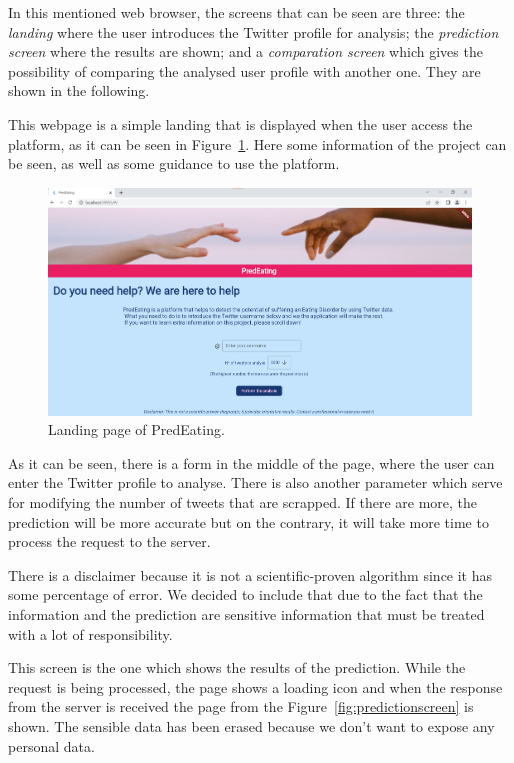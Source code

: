 In this mentioned web browser, the screens that can be seen are three: the \textit{landing} where the user introduces the Twitter profile for analysis; the \textit{prediction screen} where the results are shown; and a \textit{comparation screen} which gives the possibility of comparing the analysed user profile with another one. They are shown in the following.

This webpage is a simple landing that is displayed when the user access the platform, as it can be seen in Figure~\ref{fig:landing}. Here some information of the project can be seen, as well as some guidance to use the platform.


\begin{figure}[!htp]
    \centering
    \includegraphics[scale=0.4]{img/case/landing.png}
    \caption{Landing page of PredEating.}
    \label{fig:landing}
\end{figure}

As it can be seen, there is a form in the middle of the page, where the user can enter the Twitter profile to analyse. There is also another parameter which serve for modifying the number of tweets that are scrapped. If there are more, the prediction will be more accurate but on the contrary, it will take more time to process the request to the server.

There is a disclaimer because it is not a scientific-proven algorithm since it has some percentage of error. We decided to include that due to the fact that the information and the prediction are sensitive information that must be treated with a lot of responsibility.


This screen is the one which shows the results of the prediction. While the request is being processed, the page shows a loading icon and when the response from the server is received the page from the Figure~\ref{fig:predictionscreen} is shown. The sensible data has been erased because we don't want to expose any personal data.

